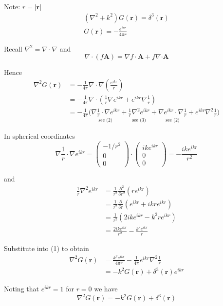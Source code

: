 


\bigskip
Note: $r=|\mathbf r|$
\begin{gather*}
\left(\nabla^2+k^2\right)G(\mathbf r)=\delta^3(\mathbf r)\tag{10.52}
\\
G(\mathbf r)=-\frac{e^{ikr}}{4\pi r}\tag{10.65}
\end{gather*}

Recall $\nabla^2=\nabla\cdot\nabla$ and
\begin{equation*}
\nabla\cdot(f\mathbf A)=\nabla f\cdot\mathbf A+f\nabla\mathbf\cdot\mathbf A
\end{equation*}

Hence
\begin{align*}
\nabla^2G(\mathbf r)&=-\frac{1}{4\pi}\nabla\cdot\nabla\left(\frac{e^{ikr}}{r}\right)
\\
&=-\frac{1}{4\pi}\nabla\cdot\left(\frac{1}{r}\nabla e^{ikr}+e^{ikr}\nabla\frac{1}{r}\right)
\\
&=-\frac{1}{4\pi}\biggl(
\underset{\text{see (2)}}{\nabla\frac{1}{r}\cdot\nabla e^{ikr}}
+\underset{\text{see (3)}}{\frac{1}{r}\nabla^2e^{ikr}}
+\underset{\text{see (2)}}{\nabla e^{ikr}\cdot\nabla\frac{1}{r}}
+e^{ikr}\nabla^2\frac{1}{r}
\biggr)\tag{1}
\end{align*}

In spherical coordinates
\begin{equation*}
\nabla\frac{1}{r}\cdot\nabla e^{ikr}
=\begin{pmatrix}-1/r^2\\0\\0\end{pmatrix}
\cdot\begin{pmatrix}ike^{ikr}\\0\\0\end{pmatrix}
=-\frac{ike^{ikr}}{r^2}\tag{2}
\end{equation*}

and
\begin{align*}
\frac{1}{r}\nabla^2e^{ikr}&=\frac{1}{r^2}\frac{\partial^2}{\partial r^2}(re^{ikr})
\\
&=\frac{1}{r^2}\frac{\partial}{\partial r}\left(e^{ikr}+ikre^{ikr}\right)
\\
&=\frac{1}{r^2}\left(2ike^{ikr}-k^2re^{ikr}\right)
\\
&=\frac{2ike^{ikr}}{r^2}-\frac{k^2e^{ikr}}{r}\tag{3}
\end{align*}

Substitute into (1) to obtain
\begin{align*}
\nabla^2G(\mathbf r)&=\frac{k^2e^{ikr}}{4\pi r}-\frac{1}{4\pi}e^{ikr}\nabla^2\frac{1}{r}
\\
&=-k^2G(\mathbf r)+\delta^3(\mathbf r)e^{ikr}
\end{align*}

Noting that $e^{ikr}=1$ for $r=0$ we have
\begin{equation*}
\nabla^2G(\mathbf r)=-k^2G(\mathbf r)+\delta^3(\mathbf r)\tag{4}
\end{equation*}


